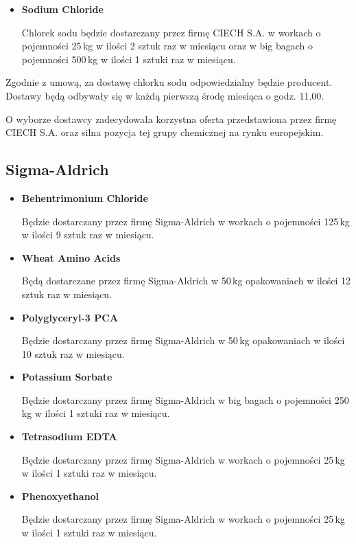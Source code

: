 \begin{itemize}
	\item \textbf{Sodium Chloride}

	Chlorek sodu będzie dostarczany przez firmę \textsf{CIECH S.A.} w workach o pojemności 25\,kg w ilości 2 sztuk raz w miesiącu oraz w big bagach o pojemności 500\,kg w ilości 1 sztuki raz w miesiącu. 
\end{itemize}\vspace{\baselineskip}

	Zgodnie z umową, za dostawę chlorku sodu odpowiedzialny będzie producent. Dostawy będą odbywały się w każdą pierwszą środę miesiąca o godz. 11.00.

	O wyborze dostawcy zadecydowała korzystna oferta przedstawiona przez firmę \textsf{CIECH S.A.} oraz silna pozycja tej grupy chemicznej na rynku europejskim.

\subsection{\textsf{Sigma-Aldrich}}

\begin{itemize}
	\item \textbf{Behentrimonium Chloride}

	Będzie dostarczany przez firmę \textsf{Sigma-Aldrich} w workach o pojemności 125\,kg w ilości 9 sztuk raz w miesiącu.

	\item \textbf{Wheat Amino Acids}

	Będą dostarczane przez firmę \textsf{Sigma-Aldrich} w 50\,kg opakowaniach w ilości 12 sztuk raz w miesiącu.

	\item \textbf{Polyglyceryl-3 PCA }

	Będzie dostarczany przez firmę \textsf{Sigma-Aldrich} w 50\,kg opakowaniach w ilości 10 sztuk raz w miesiącu.

	\item \textbf{Potassium Sorbate}

	Będzie dostarczany przez firmę \textsf{Sigma-Aldrich} w big bagach o pojemności 250\,kg w ilości 1 sztuki raz w miesiącu.

	\item \textbf{Tetrasodium EDTA}

	Będzie dostarczany przez firmę \textsf{Sigma-Aldrich} w workach o pojemności 25\,kg w ilości 1 sztuki raz w miesiącu.

	\item \textbf{Phenoxyethanol}

	Będzie dostarczany przez firmę \textsf{Sigma-Aldrich} w workach o pojemności 25\,kg w ilości 1 sztuki raz w miesiącu.
\end{itemize}\vspace{\baselineskip}

